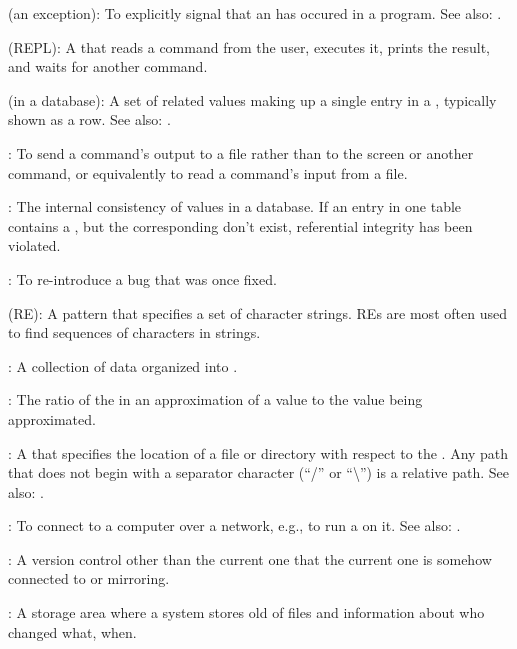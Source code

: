  (an exception):
To explicitly signal that an  has occured in a program.
See also: .

 (REPL):
A  that reads a command from the user, executes it, prints the
result, and waits for another command.

 (in a database):
A set of related values making up a
single entry in a , typically
shown as a row. See also: .

:
To send a command's output to a file rather than to
the screen or another command, or equivalently to read a command's input
from a file.

:
The internal consistency of values in a
database. If an entry in one table contains a
, but the corresponding
 don't exist, referential integrity
has been violated.

:
To re-introduce a bug that was once fixed.

 (RE):
A pattern that specifies a set of
character strings. REs are most often used to find sequences of
characters in strings.

:
A collection of data organized into
.
 
:
The ratio of the  in an approximation of a value
to the value being approximated.

:
A  that specifies the
location of a file or directory with respect to the
. Any
path that does not begin with a separator character (``/'' or
``\textbackslash{}'') is a relative path. See also:
.
 
:
To connect to a computer over a network,
e.g., to run a  on it.
See also: .

:
A version control
 other than the current one that the
current one is somehow connected to or mirroring.

:
A storage area where a
 system stores old
 of files and information about who
changed what, when.

